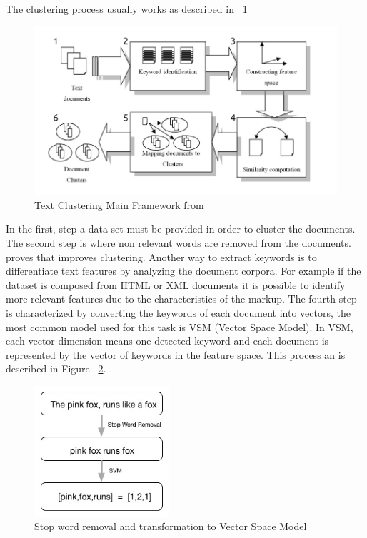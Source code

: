 The clustering process usually works as described in ~\ref{fig:1_Text_Clustering_Main_Framwork}
\begin{figure}
  \begin{center}
    \includegraphics[width=12cm]{images/1_Text_Clustering_Main_Framwork.png}
  \end{center}
  \caption{ Text Clustering Main Framework from ~\citet{Dozono2012} }
  \label{fig:1_Text_Clustering_Main_Framwork}
\end{figure}
In the first, step a data set must be provided in order to cluster the documents. 
The second step is where non relevant words are removed from the documents. ~\citet{Kang2003} proves that improves clustering. Another way to extract keywords is to differentiate text features by analyzing the document corpora. For example if the dataset is composed from HTML or XML documents it is possible to identify more relevant features due to the characteristics of the markup.
The fourth step is characterized by converting the keywords of each document into vectors, the most common model used for this task is VSM (Vector Space Model). In VSM, each vector dimension means one detected keyword and each document is represented by the vector of keywords in the feature space. This process an is described in Figure ~\ref{fig:2_svm}.

\begin{figure}
  \begin{center}
    \includegraphics[width=5cm]{images/2_svm.jpg}
  \end{center}
  \caption{ Stop word removal and transformation to Vector Space Model }
  \label{fig:2_svm}
\end{figure}


